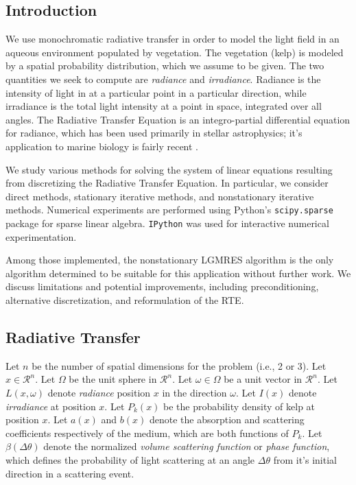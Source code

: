 \documentclass[10pt]{article}
\newcommand\RR{\mathcal{R}}
\begin{document}
\begin{multicols}{2}

\section{Introduction}
We use monochromatic radiative transfer in order to model the light field in an aqueous environment populated by vegetation.
The vegetation (kelp) is modeled by a spatial probability distribution, which we assume to be given.
The two quantities we seek to compute are \textit{radiance} and \textit{irradiance}.
Radiance is the intensity of light in at a particular point in a particular direction, while irradiance is the total light intensity at a point in space, integrated over all angles.
The Radiative Transfer Equation is an integro-partial differential equation for radiance, which has been used primarily in stellar astrophysics; it's application to marine biology is fairly recent \citep{mobley_radiative_2001}.

We study various methods for solving the system of linear equations resulting from discretizing the Radiative Transfer Equation.
In particular, we consider direct methods, stationary iterative methods, and nonstationary iterative methods.
Numerical experiments are performed using Python's \texttt{scipy.sparse} \citep{jones_scipy:_2001} package for sparse linear algebra.
\texttt{IPython} \citep{perez_ipython:_2007} was used for interactive numerical experimentation.

Among those implemented, the nonstationary LGMRES \citep{baker_technique_2005} algorithm is the only algorithm determined to be suitable for this application without further work.
We discuss limitations and potential improvements, including preconditioning, alternative discretization, and reformulation of the RTE.

\subsection{Radiative Transfer}
Let $n$ be the number of spatial dimensions for the problem (i.e., 2 or 3).
Let $x \in \RR^n$.
Let $\Omega$ be the unit sphere in $\RR^n$.
Let $\omega \in \Omega$ be a unit vector in $\RR^n$.
Let $L(x,\omega)$ denote \textit{radiance} position $x$ in the direction $\omega$.
Let $I(x)$ denote \textit{irradiance} at position $x$.
Let $P_k(x)$ be the probability density of kelp at position $x$.
Let $a(x)$ and $b(x)$ denote the absorption and scattering coefficients respectively of the medium, which are both functions of $P_k$.
Let $\beta(\Delta\theta)$ denote the normalized \textit{volume scattering function} or \textit{phase function}, which defines the probability of light scattering at an angle $\Delta\theta$ from it's initial direction in a scattering event.


\end{multicols}
\end{document}
